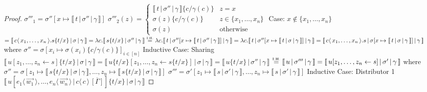 \documentclass[a4paper,UKenglish,cleveref, autoref]{lipics-v2019}
\newcommand{\set}[1]{ \{ #1 \} }
\newcommand{\abs}[2]{\lambda #1 . #2}
\newcommand{\fake}[3]{#1 \langle \, #2 \, \rangle . #3}
\newcommand{\share}[3]{#1 [#2 \leftarrow #3]}
\newcommand{\dist}[5]{#1 [ #2 \, \vert \, \fakedist{#4}{#5} \, #3 ]}
\newcommand{\fakedist}[2]{#1 \langle \, #2 \, \rangle}
\newcommand{\sub}[3]{#1 \{ #2 / #3 \}}
\newcommand{\readbackwmap}[3]{\llbracket \, #1 \, \vert \, #2 \, \vert \, #3  \, \rrbracket }
\newcommand{\IH}{\stackrel{\hbox{\tiny I.H.}}{\hbox{=}}}
\begin{document}
\begin{proof}
\newline
\indent $\sigma'''_{1} = \sigma''[x \mapsto \readbackwmap{t}{\sigma''}{\gamma}]$
\newline
\indent $\sigma'''_{2}(z) = \begin{cases} \readbackwmap{t}{\sigma''}{\gamma} \sub{}{c}{\gamma(c)} & z = x \\ \sigma(z) \sub{}{c}{\gamma(c)} & z \in \set{x_{1}, \dots, x_{n}} \\ \sigma(z) & \text{otherwise} \end{cases}$
\newline
\newline
\indent Case: $x \not\in \set{x_{1}, \dots, x_{n}}$
\newline
\indent $= \readbackwmap{\fake{c}{x_{1}, \dots, x_{n}}{s \sub{}{t}{x}}}{\sigma}{\gamma} = \abs{c}{\readbackwmap{s \sub{}{t}{x}}{\sigma''}{\gamma}} \IH \abs{c}{\readbackwmap{t}{\sigma''[x \mapsto \readbackwmap{t}{\sigma''}{\gamma}]}{\gamma}} = \abs{c}{\readbackwmap{t}{\sigma''[x \mapsto \readbackwmap{t}{\sigma}{\gamma}]}{\gamma}} = \readbackwmap{\fake{c}{x_{1}, \dots, x_{n}}{s}}{\sigma[x \mapsto \readbackwmap{t}{\sigma}{\gamma}]}{\gamma}$
\newline
\indent where
\newline
\indent $\sigma'' = \sigma[x_{i} \mapsto \sigma(x_{i}) \sub{}{c}{\gamma(c)}]_{i \in [n]}$
\newline
\newline
Inductive Case: Sharing
\newline
$\readbackwmap{\share{u}{z_{1}, \dots, z_{n}}{s} \sub{}{t}{x}}{\sigma}{\gamma} = \readbackwmap{\share{u \sub{}{t}{x}}{z_{1}, \dots, z_{n}}{s \sub{}{t}{x}} }{\sigma}{\gamma} = \readbackwmap{u \sub{}{t}{x}}{\sigma''}{\gamma}$
\newline
$\IH \readbackwmap{u}{\sigma'''}{\gamma} = \readbackwmap{\share{u}{z_{1}, \dots, z_{n}}{s}}{\sigma'}{\gamma}$
\newline
where
\newline
$\sigma'' = \sigma [z_{1} \mapsto \readbackwmap{s \sub{}{t}{x}}{\sigma}{\gamma} , \dots , z_{n} \mapsto \readbackwmap{s \sub{}{t}{x}}{\sigma}{\gamma} ]$
\newline
$\sigma''' = \sigma' [z_{1} \mapsto \readbackwmap{s}{\sigma'}{\gamma} , \dots , z_{n} \mapsto \readbackwmap{s }{\sigma'}{\gamma} ]$
\newline
\newline
Inductive Case: Distributor 1
\newline
$\readbackwmap{\dist{u}{\fakedist{e_{1}}{\vec{w_{1}}}, \dots, \fakedist{e_{n}}{\vec{w_{n}}}}{\overline{[\Gamma]}}{c}{c} \sub{}{t}{x}}{\sigma}{\gamma}$

\end{proof}
\end{document}
